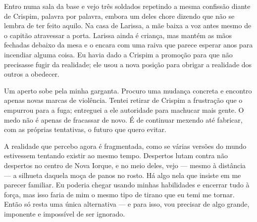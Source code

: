 Entro numa sala da base e vejo três soldados repetindo a mesma confissão diante de Crispim, palavra por palavra, embora um deles chore dizendo que não se lembra de ter feito aquilo. Na casa de Larissa, a mãe baixa a voz antes mesmo de o capitão atravessar a porta. Larissa ainda é criança, mas mantém as mãos fechadas debaixo da mesa e o encara com uma raiva que parece esperar anos para incendiar alguma coisa. Eu havia dado a Crispim a promoção para que não precisasse fugir da realidade; ele usou a nova posição para obrigar a realidade dos outros a obedecer.

Um aperto sobe pela minha garganta. Procuro uma mudança concreta e encontro apenas novas marcas de violência. Tentei retirar de Crispim a frustração que o empurrou para a fuga; entreguei a ele autoridade para machucar mais gente. O medo não é apenas de fracassar de novo. É de continuar mexendo até fabricar, com as próprias tentativas, o futuro que quero evitar.

A realidade que percebo agora é fragmentada, como se várias versões do mundo estivessem tentando existir ao mesmo tempo. Despertos lutam contra não despertos no centro de Nova Iorque, e no meio deles, vejo — mesmo à distância — a silhueta daquela moça de panos no rosto. Há algo nela que insiste em me parecer familiar. Eu poderia chegar usando minhas habilidades e encerrar tudo à força, mas isso faria de mim o mesmo tipo de tirano que eu temi me tornar. Então só resta uma única alternativa — e para isso, vou precisar de algo grande, imponente e impossível de ser ignorado.
